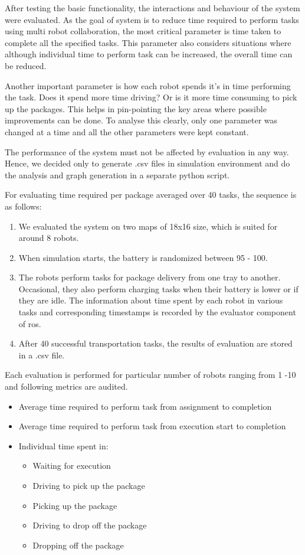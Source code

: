 \documentclass[journal]{IEEEtran}
\begin{document}
After testing the basic functionality, the interactions and behaviour of the system were evaluated. As the goal of system is to reduce time required to perform tasks using multi robot collaboration, the most critical parameter is time taken to complete all the specified tasks. This parameter also considers situations where although individual time to perform task can be increased, the overall time can be reduced.

Another important parameter is how each robot spends it's in time performing the task. Does it spend more time driving? Or is it more time consuming to pick up the packages. This helps in pin-pointing the key areas where possible improvements can be done. To analyse this clearly, only one parameter was changed at a time and all the other parameters were kept constant.

The performance of the system must not be affected by evaluation in any way. Hence, we decided only to generate .csv files in simulation environment and do the analysis and graph generation in a separate python script. 

For evaluating time required per package averaged over 40 tasks, the sequence is as follows:

\begin{enumerate}
\item We evaluated the system on two maps of 18x16 size, which is suited for around 8 robots.
\item When simulation starts, the battery is randomized between 95 - 100.
\item The robots perform tasks for package delivery from one tray to another. Occasional, they also perform charging tasks when their battery is lower or if they are idle. The information about time spent by each robot in various tasks and corresponding timestamps is recorded by the evaluator component of ros. 
\item After 40 successful transportation tasks, the results of evaluation are stored in a .csv file.
\end{enumerate}

Each evaluation is performed for particular number of robots ranging from 1 -10 and following metrics are audited.

\begin{itemize}
\item Average time required to perform task from assignment to completion
\item Average time required to perform task from execution start to completion
\item Individual time spent in:	
\begin{itemize}
\item Waiting for execution
\item Driving to pick up the package	
\item Picking up the package	
\item Driving to drop off the package	
\item Dropping off the package		
\end{itemize}
\end{itemize}
\end{document}
